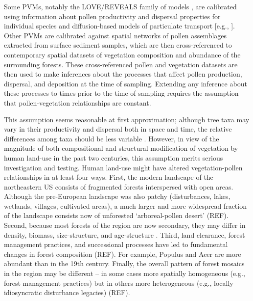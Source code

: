 \documentclass[12pt]{article}
\begin{document}
Some PVMs, notably the LOVE/REVEALS family of models
\citep{sugita2007theory1, sugita2007theory2}, are calibrated using
information about pollen productivity and dispersal properties for
individual species and diffusion-based models of particulate transport
[e.g., \citet{prentice1985pollen}]. Other PVMs are calibrated against
spatial networks of pollen assemblages extracted from surface sediment
samples, which are then cross-referenced to contemporary spatial
datasets of vegetation composition and abundance of the surrounding
forests. These cross-referenced pollen and vegetation datasets are
then used to make inferences about the processes that affect pollen
production, dispersal, and deposition at the time of
sampling.  Extending any inference about these processes to times prior
to the time of sampling requires the assumption that pollen-vegetation
relationships are constant.

This assumption seems reasonable at first approximation; although tree
taxa may vary in their productivity and dispersal both in space and
time, the relative differences among taxa should be less variable
\citep{parsons1981statistical}.  However, in view of the magnitude of
both compositional and structural modification of vegetation by human
land-use in the past two centuries, this assumption merits serious
investigation and testing.  Human land-use might have altered
vegetation-pollen relationships in at least four ways.  First, the
modern landscape of the northeastern US consists of fragmented forests
interspersed with open areas.  Although the pre-European landscape was
also patchy (disturbances, lakes, wetlands, villages, cultivated
areas), a much larger and more widespread fraction of the landscape
consists now of unforested ‘arboreal-pollen desert’ (REF).  Second,
because most forests of the region are now secondary, they may differ
in density, biomass, size-structure, and age-structure
\citep{rhemtulla2009legacies}.  Third, land clearance, forest
management practices, and successional processes have led to
fundamental changes in forest composition (REF).  For example, Populus
and Acer are more abundant than in the 19th century.  Finally, the
overall pattern of forest mosaics in the region may be different – in
some cases more spatially homogeneous (e.g., forest management
practices) but in others more heterogeneous (e.g., locally
idiosyncratic disturbance legacies) (REF).
\end{document}
